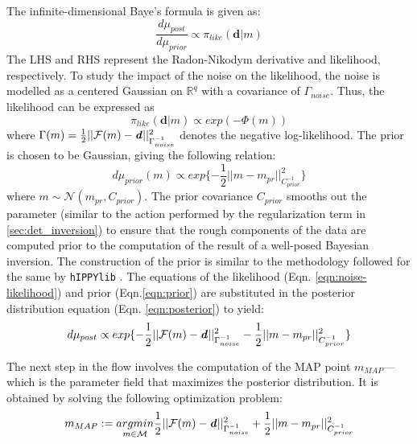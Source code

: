 The infinite-dimensional Baye's formula is given as:
\begin{equation}
    \label{eqn:posterior}
    \frac{d\mu_{post}}{d\mu_{prior}} \propto \pi_{like}(\textbf{d}|m)
\end{equation}
The LHS and RHS represent the Radon-Nikodym derivative \cite{williams1991probability} and likelihood, respectively. 
To study the impact of the noise on the likelihood, the noise is modelled as a centered Gaussian on $\mathbb{R}^q$ with a covariance of $\Gamma_{noise}$. Thus, the likelihood can be expressed as
\begin{equation}
    \label{eqn:noise-likelihood}
    \pi_{like}(\textbf{d}|m) \propto exp(-\Phi(m))
\end{equation}
where $\Gamma(m) = \frac{1}{2}||\mathcal{F}(m) - \textbf{\textit{d}}||^2_{\Gamma_{noise}^{-1}}$ denotes the negative log-likelihood.
The prior is chosen to be Gaussian, giving the following relation:
\begin{equation}
    \label{eqn:prior}
    d\mu_{prior}(m) \propto exp\{ -\frac{1}{2}|| m - m_{pr} ||^2_{C^{-1}_{prior}} \}
\end{equation}
where $m \sim \mathcal{N}(m_{pr}, C_{prior})$. The prior covariance $C_{prior}$ smooths out the parameter (similar to the action performed by the regularization term in \ref{sec:det_inversion}) to ensure that the rough components of the data are computed prior to the computation of the result of a well-posed Bayesian inversion. The construction of the prior is similar to the methodology followed for the same by \texttt{hIPPYlib} \cite{villa2018hippylib}.
The equations of the likelihood (Eqn. \eqref{eqn:noise-likelihood}) and prior (Eqn.\eqref{eqn:prior}) are substituted in the posterior distribution equation (Eqn. \eqref{eqn:posterior}) to yield:
\begin{equation}
    \label{eqn:posterior2}
    d\mu_{post} \propto exp \{ - \frac{1}{2}||\mathcal{F}(m) - \textbf{\textit{d}}||^2_{\Gamma^{-1}_{noise}} - \frac{1}{2}||m - m_{pr}||^2_{C^{-1}_{prior}} \}
\end{equation}

The next step in the flow involves the computation of the MAP point $m_{MAP}$---which is the parameter field that maximizes the posterior distribution. It is obtained by solving the following optimization problem:
\begin{equation}
    \label{eqn:map}
    m_{MAP} := \underset{m \in \mathcal{M}}{argmin}\frac{1}{2}||\mathcal{F}(m) - \textbf{\textit{d}}||^2_{\Gamma_{noise}^{-1}} + \frac{1}{2}||m - m_{pr}||^2_{C_{prior}^{-1}}
\end{equation}

